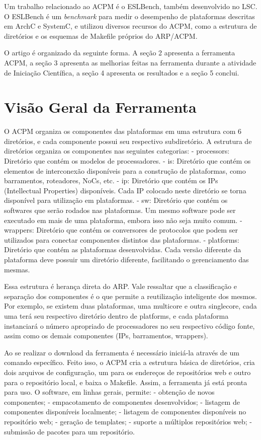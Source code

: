 \documentclass[12pt]{article}
\begin{document}
Um trabalho relacionado ao ACPM é o ESLBench, também desenvolvido no LSC.
O ESLBench é um \textit{benchmark} para medir o desempenho de plataformas descritas em
ArchC e SystemC, e utilizou diversos recursos do ACPM, como a estrutura de
diretórios e os esquemas de Makefile próprios do ARP/ACPM. 

O artigo é organizado da seguinte forma. A seção 2 apresenta a ferramenta ACPM, a
seção 3 apresenta as melhorias feitas na ferramenta durante a atividade de
Iniciação Científica, a seção 4 apresenta os resultados e a seção 5 conclui.


\section{Visão Geral da Ferramenta}

O ACPM organiza os componentes das plataformas em uma estrutura com 6
diretórios, e cada componente possui seu respectivo subdiretório. A estrutura de
diretórios organiza os componentes nas seguintes categorias:
    - processors: Diretório que contém os modelos de processadores.
    - is: Diretório que contém os elementos de interconexão disponíveis para a
        construção de plataformas, como barramentos, roteadores, NoCs, etc.
    - ip: Diretório que contém os IPs (Intellectual Properties) disponíveis. 
        Cada IP colocado neste diretório se torna disponível para utilização em
        plataformas.
    - sw: Diretório que contém os softwares que serão rodados nas plataformas.
        Um mesmo software pode ser executado em mais de uma plataforma, embora
        isso não seja muito comum.
    - wrappers: Diretório que contém os conversores de protocolos que podem ser
        utilizados para conectar componentes distintos das plataformas.
    - platforms: Diretório que contém as plataformas desenvolvidas. Cada versão
        diferente da plataforma deve possuir um diretório diferente, facilitando
        o gerenciamento das mesmas.

Essa estrutura é herança direta do ARP. Vale ressaltar que a classificação e
separação dos componentes é o que permite a reutilização inteligente dos mesmos.
Por exemplo, se existem duas plataformas, uma multicore e outra singlecore, cada
uma terá seu respectivo diretório dentro de platforms, e cada plataforma
instanciará o número apropriado de processadores no seu respectivo código fonte,
assim como os demais componentes (IPs, barramentos, wrappers).

Ao se realizar o download da ferramenta é necessário iniciá-la através de um
comando específico. Feito isso, o ACPM cria a estrutura básica de diretórios,
cria dois arquivos de configuração, um para os endereços de repositórios web e
outro para o repositório local, e baixa o Makefile. Assim, a ferramenta já está
pronta para uso. O software, em linhas gerais, permite:
    - obtenção de novos componentes;
    - empacotamento de componentes desenvolvidos;
    - listagem de componentes disponíveis localmente;
    - listagem de componentes disponíveis no repositório web;
    - geração de templates;
    - suporte a múltiplos repositórios web;
    - submissão de pacotes para um repositório.
\end{document}
